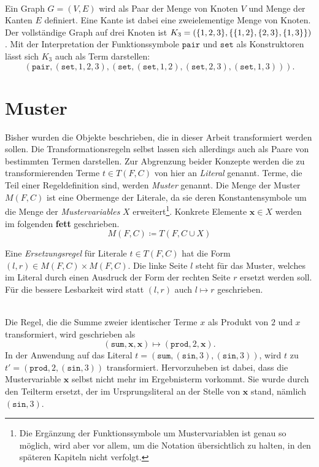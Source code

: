 \begin{beispiel}~\\
Ein Graph $G = (V, E)$ wird als Paar der Menge von Knoten $V$ und Menge der Kanten $E$ definiert. Eine Kante ist dabei eine zweielementige Menge von Knoten. Der vollständige Graph auf drei Knoten ist $K_3 = \paren*{\{1, 2, 3\}, \curl*{\{1, 2\}, \{2, 3\}, \{1, 3\}}}$. Mit der Interpretation der Funktionssymbole $\texttt{pair}$ und $\texttt{set}$ als Konstruktoren lässt sich $K_3$ auch als Term darstellen:
$$(\texttt{pair}, (\texttt{set}, 1, 2, 3), (\texttt{set}, (\texttt{set}, 1, 2), (\texttt{set}, 2, 3), (\texttt{set}, 1, 3))).$$
\end{beispiel}





\section{Muster} \label{subsecMuster}

Bisher wurden die Objekte beschrieben, die in dieser Arbeit transformiert werden sollen. Die Transformationsregeln selbst lassen sich allerdings auch als Paare von bestimmten Termen darstellen. Zur Abgrenzung beider Konzepte werden die zu transformierenden Terme $t\in T(F, C)$ von hier an \emph{\Gls{Literal}} genannt. Terme, die  Teil einer Regeldefinition sind, werden \emph{\Gls{Muster}} genannt. Die Menge der Muster $M(F, C)$ ist eine Obermenge der Literale, da sie deren Konstantensymbole um die Menge der \emph{\Glspl{Mustervariable}} $X$ erweitert\footnote{Die Ergänzung der Funktionssymbole um Mustervariablen ist genau so möglich, wird aber vor allem, um die Notation übersichtlich zu halten, in den späteren Kapiteln nicht verfolgt.}. Konkrete Elemente $\mathbf x \in X$ werden im folgenden \textbf{fett} geschrieben.
$$M(F, C) \coloneqq T(F, C \cup X)$$

Eine \emph{\Gls{Ersetzungsregel}} für Literale $t \in T(F, C)$ hat die Form $(l, r) \in M(F, C) \times M(F, C)$. Die linke Seite $l$ steht für das Muster, welches im Literal durch einen Ausdruck der Form der rechten Seite $r$ ersetzt werden soll. Für die bessere Lesbarkeit wird statt $(l, r)$ auch $l \mapsto r$ geschrieben.

\begin{beispiel}~\\ \label{bMuster}
Die Regel, die die Summe zweier identischer Terme $x$ als Produkt von $2$ und $x$ transformiert, wird geschrieben als
$$(\texttt{sum}, \mathbf x, \mathbf x) \mapsto (\texttt{prod}, 2, \mathbf x).$$
In der Anwendung auf das Literal 
$t = (\texttt{sum}, (\texttt{sin}, 3), (\texttt{sin}, 3))$, wird $t$ zu $t' = (\texttt{prod}, 2, (\texttt{sin}, 3))$ transformiert. 
Hervorzuheben ist dabei, dass die Mustervariable $\mathbf x$ selbst nicht mehr im Ergebnisterm vorkommt. Sie wurde durch den Teilterm ersetzt, der im Ursprungsliteral an der Stelle von $\mathbf x$ stand, nämlich $(\texttt{sin}, 3)$.
\end{beispiel}

